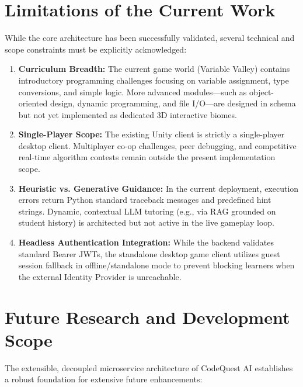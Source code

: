 \section{Limitations of the Current Work}
While the core architecture has been successfully validated, several technical and scope constraints must be explicitly acknowledged:
\begin{enumerate}
    \item \textbf{Curriculum Breadth:} The current game world (Variable Valley) contains introductory programming challenges focusing on variable assignment, type conversions, and simple logic. More advanced modules—such as object-oriented design, dynamic programming, and file I/O—are designed in schema but not yet implemented as dedicated 3D interactive biomes.
    \item \textbf{Single-Player Scope:} The existing Unity client is strictly a single-player desktop client. Multiplayer co-op challenges, peer debugging, and competitive real-time algorithm contests remain outside the present implementation scope.
    \item \textbf{Heuristic vs. Generative Guidance:} In the current deployment, execution errors return Python standard traceback messages and predefined hint strings. Dynamic, contextual LLM tutoring (e.g., via RAG grounded on student history) is architected but not active in the live gameplay loop.
    \item \textbf{Headless Authentication Integration:} While the backend validates standard Bearer JWTs, the standalone desktop game client utilizes guest session fallback in offline/standalone mode to prevent blocking learners when the external Identity Provider is unreachable.
\end{enumerate}

\section{Future Research and Development Scope}
The extensible, decoupled microservice architecture of CodeQuest AI establishes a robust foundation for extensive future enhancements:

